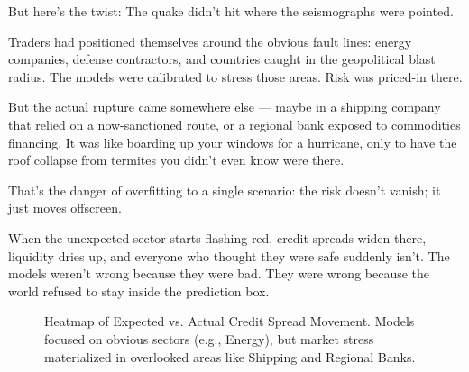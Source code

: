 \medskip

But here’s the twist: The quake didn’t hit where the seismographs were pointed.

Traders had positioned themselves around the obvious fault lines: energy companies, defense contractors, and countries caught 
in the geopolitical blast radius. The models were calibrated to stress those areas. Risk was priced-in there.

But the actual rupture came somewhere else — maybe in a shipping company that relied on a now-sanctioned route, or a regional 
bank exposed to commodities financing. It was like boarding up your windows for a hurricane, only to have the roof collapse 
from termites you didn’t even know were there.

That’s the danger of overfitting to a single scenario: the risk doesn’t vanish; it just moves offscreen.

When the unexpected sector starts flashing red, credit spreads widen there, liquidity dries up, and everyone who thought 
they were safe suddenly isn’t. The models weren’t wrong because they were bad.  They were wrong because the world refused 
to stay inside the prediction box.

\medskip

\begin{figure}[H]
  \centering
  \caption{Heatmap of Expected vs. Actual Credit Spread Movement. Models focused on obvious sectors (e.g., Energy), but market stress materialized in overlooked areas like Shipping and Regional Banks.}
\end{figure}

